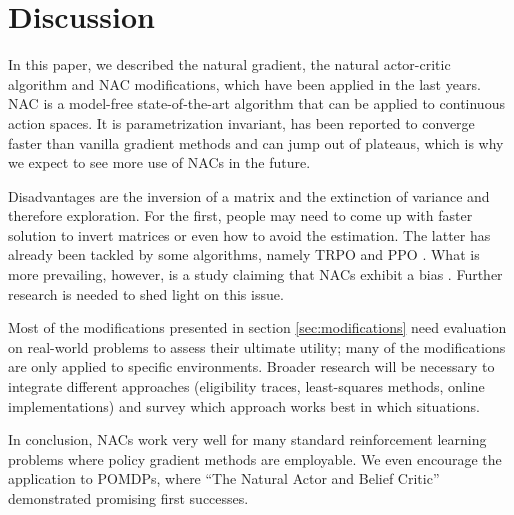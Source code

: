
\section{Discussion}
\label{sec:discussion}

In this paper, we described the natural gradient, the natural actor-critic algorithm and NAC modifications, which have been applied in the last years. NAC is a model-free state-of-the-art algorithm that can be applied to continuous action spaces. It is parametrization invariant, has been reported to converge faster than vanilla gradient methods and can jump out of plateaus, which is why we expect to see more use of NACs in the future. 

Disadvantages are the inversion of a matrix and the extinction of variance and therefore exploration. For the first, people may need to come up with faster solution to invert matrices or even how to avoid the estimation. The latter has already been tackled by some algorithms, namely TRPO \citep{schulman2015trust} and PPO \citep{schulman2017proximal}. What is more prevailing, however, is a study claiming that NACs exhibit a bias \cite{thomas2014bias}. Further research is needed to shed light on this issue.

Most of the modifications presented in section \ref{sec:modifications} need evaluation on real-world problems to assess their ultimate utility; many of the modifications are only applied to specific environments. Broader research will be necessary to integrate different approaches (eligibility traces, least-squares methods, online implementations) and survey which approach works best in which situations.

In conclusion, NACs work very well for many standard reinforcement learning problems where policy gradient methods are employable. We even encourage the application to POMDPs, where ``The Natural Actor and Belief Critic'' \cite{jurvcivcek2011natural} demonstrated promising first successes.

\newpage



